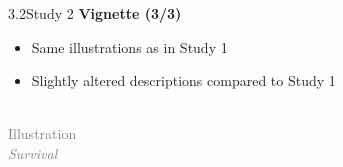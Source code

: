 \documentclass[xcolor=table,9pt,aspectratio=169]{beamer}
\begin{document}
\begin{frame}{\vspace*{10mm}3.2\hspace*{1em}Study 2}
\textbf{Vignette (3/3)}\\
\medskip
\begin{itemize}
   \item Same illustrations as in Study 1
   \item Slightly altered descriptions compared to Study 1
\end{itemize}
\medskip
\begin{multicols}{4}
   \begin{center}
      \\
      \textcolor{gray}{Illustration\\\textit{Survival}}\\

\end{center}
\end{multicols}
\end{frame}
\end{document}
